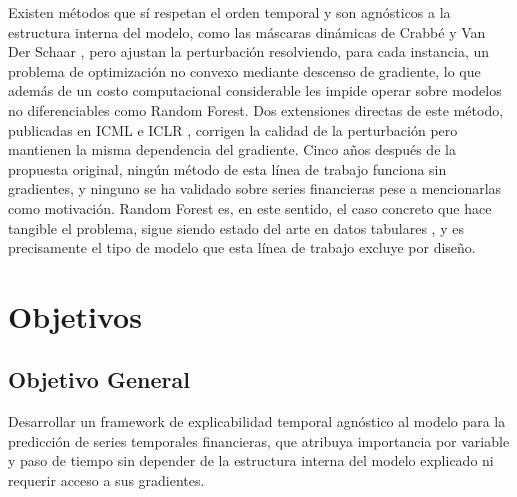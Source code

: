 Existen métodos que sí respetan el orden temporal y son agnósticos a la estructura interna del modelo, como las máscaras dinámicas de Crabbé y Van Der Schaar \cite{crabbe2021}, pero ajustan la perturbación resolviendo, para cada instancia, un problema de optimización no convexo mediante descenso de gradiente, lo que además de un costo computacional considerable les impide operar sobre modelos no diferenciables como Random Forest. Dos extensiones directas de este método, publicadas en ICML \cite{enguehard2023} e ICLR \cite{liu2024contralsp}, corrigen la calidad de la perturbación pero mantienen la misma dependencia del gradiente. Cinco años después de la propuesta original, ningún método de esta línea de trabajo funciona sin gradientes, y ninguno se ha validado sobre series financieras pese a mencionarlas como motivación. Random Forest es, en este sentido, el caso concreto que hace tangible el problema, sigue siendo estado del arte en datos tabulares \cite{grinsztajn2022}, y es precisamente el tipo de modelo que esta línea de trabajo excluye por diseño.

\section{Objetivos}

\subsection{Objetivo General}
Desarrollar un framework de explicabilidad temporal agnóstico al modelo para la predicción de series temporales financieras, que atribuya importancia por variable y paso de tiempo sin depender de la estructura interna del modelo explicado ni requerir acceso a sus gradientes.

